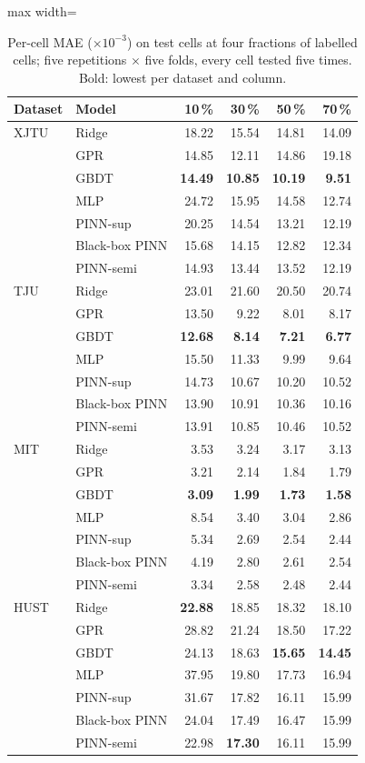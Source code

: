 \begin{table}[t]\centering\small
\caption{Per-cell MAE ($\times10^{-3}$) on test cells at four fractions of labelled cells; five repetitions $\times$ five folds, every cell tested five times. Bold: lowest per dataset and column.}\label{tab:labels}
\begin{adjustbox}{max width=\textwidth}\begin{tabular}{llrrrr}\toprule
Dataset & Model & 10\,\% & 30\,\% & 50\,\% & 70\,\% \\\midrule
XJTU & Ridge & 18.22 & 15.54 & 14.81 & 14.09 \\
 & GPR & 14.85 & 12.11 & 14.86 & 19.18 \\
 & GBDT & \textbf{14.49} & \textbf{10.85} & \textbf{10.19} & \textbf{9.51} \\
 & MLP & 24.72 & 15.95 & 14.58 & 12.74 \\
 & PINN-sup & 20.25 & 14.54 & 13.21 & 12.19 \\
 & Black-box PINN & 15.68 & 14.15 & 12.82 & 12.34 \\
 & PINN-semi & 14.93 & 13.44 & 13.52 & 12.19 \\
\addlinespace
TJU & Ridge & 23.01 & 21.60 & 20.50 & 20.74 \\
 & GPR & 13.50 & 9.22 & 8.01 & 8.17 \\
 & GBDT & \textbf{12.68} & \textbf{8.14} & \textbf{7.21} & \textbf{6.77} \\
 & MLP & 15.50 & 11.33 & 9.99 & 9.64 \\
 & PINN-sup & 14.73 & 10.67 & 10.20 & 10.52 \\
 & Black-box PINN & 13.90 & 10.91 & 10.36 & 10.16 \\
 & PINN-semi & 13.91 & 10.85 & 10.46 & 10.52 \\
\addlinespace
MIT & Ridge & 3.53 & 3.24 & 3.17 & 3.13 \\
 & GPR & 3.21 & 2.14 & 1.84 & 1.79 \\
 & GBDT & \textbf{3.09} & \textbf{1.99} & \textbf{1.73} & \textbf{1.58} \\
 & MLP & 8.54 & 3.40 & 3.04 & 2.86 \\
 & PINN-sup & 5.34 & 2.69 & 2.54 & 2.44 \\
 & Black-box PINN & 4.19 & 2.80 & 2.61 & 2.54 \\
 & PINN-semi & 3.34 & 2.58 & 2.48 & 2.44 \\
\addlinespace
HUST & Ridge & \textbf{22.88} & 18.85 & 18.32 & 18.10 \\
 & GPR & 28.82 & 21.24 & 18.50 & 17.22 \\
 & GBDT & 24.13 & 18.63 & \textbf{15.65} & \textbf{14.45} \\
 & MLP & 37.95 & 19.80 & 17.73 & 16.94 \\
 & PINN-sup & 31.67 & 17.82 & 16.11 & 15.99 \\
 & Black-box PINN & 24.04 & 17.49 & 16.47 & 15.99 \\
 & PINN-semi & 22.98 & \textbf{17.30} & 16.11 & 15.99 \\
\bottomrule\end{tabular}\end{adjustbox}\end{table}

